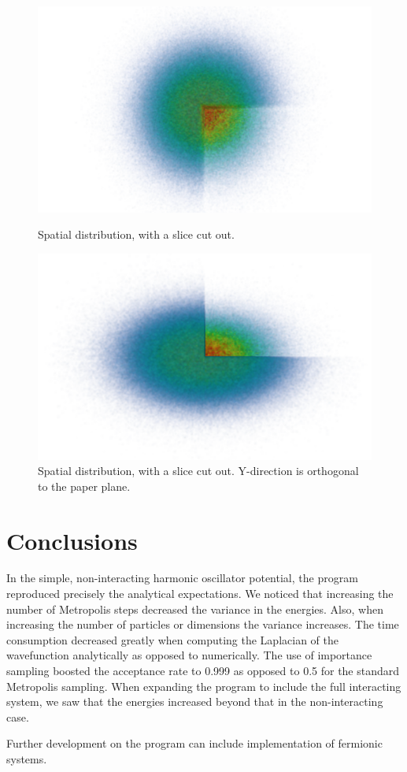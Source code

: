 \documentclass[english, a4paper]{article}
\begin{document}
\begin{figure}[H]
\begin{minipage}[t]{0.48\linewidth}
  \includegraphics[width=\textwidth]{../modifiedMortenCode/figures/spatialDistributione8.png}
  \caption{Spatial distribution, with a slice cut out.}
  \label{fig:spatialDistribution}
\end{minipage}
\quad
\begin{minipage}[t]{0.48\linewidth}
\includegraphics[width=\textwidth]{../modifiedMortenCode/figures/spatialDistributione8yz.png}
  \caption{Spatial distribution, with a slice cut out. Y-direction is orthogonal to the paper plane.}
  \label{fig:spatialDistribution2}
\end{minipage}
\end{figure}

\section{Conclusions}
In the simple, non-interacting harmonic oscillator potential, the program reproduced precisely the analytical expectations.
We noticed that increasing the number of Metropolis steps decreased the variance in the energies. 
Also, when increasing the number of particles or dimensions the variance increases. 
The time consumption decreased greatly when computing the Laplacian of the wavefunction analytically as opposed to numerically. 
The use of importance sampling boosted the acceptance rate to 0.999 as opposed to 0.5 for the standard Metropolis sampling.
When expanding the program to include the full interacting system, we saw that the energies increased beyond that in the non-interacting case.


Further development on the program can include implementation of fermionic systems.



\end{document}
